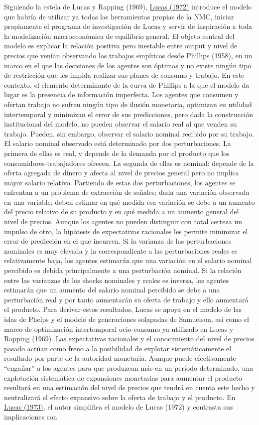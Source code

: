 \documentclass{nuevotema}
\begin{document}
Siguiendo la estela de Lucas y Rapping (1969), \underline{Lucas (1972)} introduce el modelo que habría de utilizar ya todas las herramientas propias de la NMC, iniciar propiamente el programa de investigación de Lucas y servir de inspiración a toda la modelización macroeconómica de equilibrio general. El objeto central del modelo es explicar la relación positiva pero inestable entre output y nivel de precios que venían observando los trabajos empíricos desde Phillips (1958), en un marco en el que las decisiones de los agentes son óptimas y no existe ningún tipo de restricción que les impida realizar sus planes de consumo y trabajo. En este contexto, el elemento determinante de la curva de Phillips a la que el modelo da lugar es la presencia de información imperfecta. Los agentes que consumen y ofertan trabajo no sufren ningún tipo de ilusión monetaria, optimizan su utilidad intertemporal y minimizan el error de sus predicciones, pero dada la construcción institucional del modelo, no pueden observar el salario real al que venden su trabajo. Pueden, sin embargo, observar el salario nominal recibido por su trabajo. El salario nominal observado está determinado por dos perturbaciones. La primera de ellas es real, y depende de la demanda por el producto que los consumidores-trabajadores ofrecen. La segunda de ellas es nominal: depende de la oferta agregada de dinero y afecta al nivel de precios general pero no implica mayor salario relativo. Partiendo de estas dos perturbaciones, los agentes se enfrentan a un problema de extracción de señales: dada una variación observada en una variable, deben estimar en qué medida esa variación se debe a un aumento del precio relativo de su producto y en qué medida a un aumento general del nivel de precios. Aunque los agentes no pueden distinguir con total certeza un impulso de otro, la hipótesis de expectativas racionales les permite minimizar el error de predicción en el que incurren. Si la varianza de las perturbaciones nominales es muy elevada y la correspondiente a las perturbaciones reales es relativamente baja, los agentes estimarán que una variación en el salario nominal percibido es debida principalmente a una perturbación nominal. Si la relación entre las varianzas de los shocks nominales y reales es inversa, los agentes estimarán que un aumento del salario nominal percibido se debe a una perturbación real y por tanto aumentarán su oferta de trabajo y ello aumentará el producto. Para derivar estos resultados, Lucas se apoya en el modelo de las islas de Phelps y el modelo de generaciones solapadas de Samuelson, así como el marco de optimización intertemporal ocio-consumo ya utilizado en Lucas y Rapping (1969). Las expectativas racionales y el conocimiento del nivel de precios pasado actúan como freno a la posibilidad de explotar sistemáticamente el resultado por parte de la autoridad monetaria. Aunque puede efectivamente ``engañar'' a los agentes para que produzcan más en un periodo determinado, una explotación sistemática de expansiones monetarias para aumentar el producto resultará en una estimación del nivel de precios que tendrá en cuenta este hecho y neutralizará el efecto expansivo sobre la oferta de trabajo y el producto. En \underline{Lucas (1973)}, el autor simplifica el modelo de Lucas (1972) y contrasta sus implicaciones con 
\end{document}
